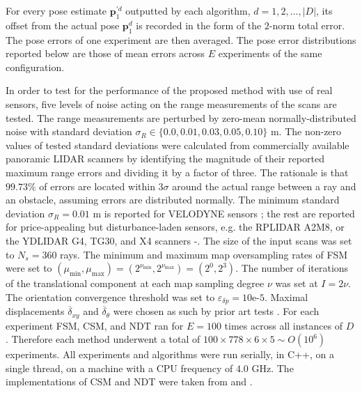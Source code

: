 For every pose estimate $\bm{p}_1^{\prime d}$ outputted by
each algorithm, $d = 1,2,\dots,|D|$, its offset from the actual pose
$\bm{p}_1^d$ is recorded in the form of the $2$-norm total error. The pose
errors of one experiment are then averaged. The pose error distributions
reported below are those of mean errors across $E$ experiments of the same
configuration.

In order to test for the performance of the proposed method with use of real
sensors, five levels of noise acting on the range measurements of the scans are
tested. The range measurements are perturbed by zero-mean normally-distributed
noise with standard deviation $\sigma_R \in \{0.0, 0.01, 0.03, 0.05, 0.10\}$ m.
The non-zero values of tested standard deviations were calculated from
commercially available panoramic LIDAR scanners by identifying the magnitude of
their reported maximum range errors and dividing it by a factor of three. The
rationale is that $99.73\%$ of errors are located within $3\sigma$ around the
actual range between a ray and an obstacle, assuming errors are distributed
normally. The minimum standard deviation $\sigma_R = 0.01$ m is reported for
VELODYNE sensors \cite{velodyne_datasheet}; the rest are reported for
price-appealing but disturbance-laden sensors, e.g. the RPLIDAR A2M8, or the
YDLIDAR G4, TG30, and X4 scanners \cite{a2m8_datasheet}-\cite{x4_datasheet}. The
size of the input scans was set to $N_s=360$ rays. The minimum and maximum map
oversampling rates of FSM were set to $(\mu_{\min},\mu_{\max}) =
(2^{\nu_{\min}},2^{\nu_{\max}}) = (2^0,2^3)$. The number of iterations of the
translational component at each map sampling degree $\nu$ was set at $I =
2\nu$. The orientation convergence threshold was set to $\varepsilon_{\delta p}
= 10$e-$5$. Maximal displacements $\overline{\delta}_{xy}$ and
$\overline{\delta}_\theta$ were chosen as such by prior art tests \cite{plicp}.
For each experiment FSM, CSM, and NDT ran for $E = 100$ times across all
instances of $D$. Therefore each method underwent a total of
$100 \times 778 \times 6 \times 5 \sim O(10^6)$ experiments.
All experiments and algorithms were run serially, in C++, on
a single thread, on a machine with a CPU frequency of $4.0$ GHz. The
implementations of CSM and NDT were taken from \cite{csm_implementation} and
\cite{ndt_implementation}.
